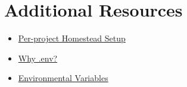 \section{Additional Resources}

\begin{itemize}[leftmargin=*]
    \item \href{http://laravel.com/docs/master/homestead#per-project-installation}{Per-project Homestead Setup}
    \item \href{https://github.com/vlucas/phpdotenv#why-env}{Why .env?}
    \item \href{https://en.wikipedia.org/wiki/Environment\_variable}{Environmental Variables}
\end{itemize}
